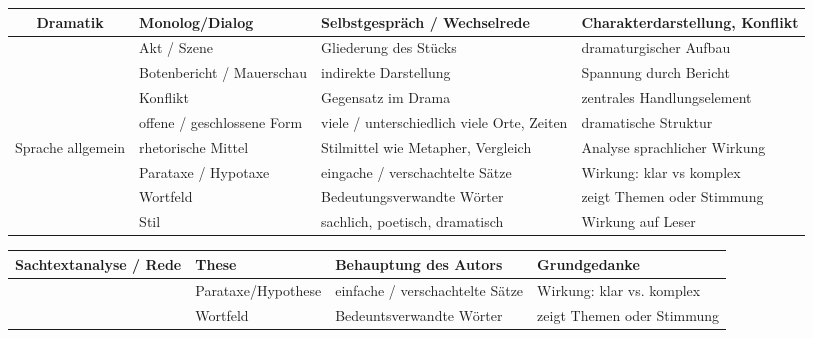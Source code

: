 \begin{tabularx}{\textwidth}{|c|p{2.5cm}|X|X|}
    \hline
    Dramatik & Monolog/Dialog & Selbstgespräch / Wechselrede & Charakterdarstellung, Konflikt \\
    \hline
    & Akt / Szene & Gliederung des Stücks & dramaturgischer Aufbau \\
    \hline
    & Botenbericht / Mauerschau & indirekte Darstellung & Spannung durch Bericht \\
    \hline
    & Konflikt & Gegensatz im Drama & zentrales Handlungselement \\
    \hline
    & offene / geschlossene Form & viele / unterschiedlich viele Orte, Zeiten & dramatische Struktur \\
    \hline
    Sprache allgemein & rhetorische Mittel & Stilmittel wie Metapher, Vergleich & Analyse sprachlicher Wirkung \\
    \hline
    & Parataxe / Hypotaxe & eingache / verschachtelte Sätze & Wirkung: klar vs komplex \\
    \hline
    & Wortfeld & Bedeutungsverwandte Wörter & zeigt Themen oder Stimmung \\
    \hline
    & Stil & sachlich, poetisch, dramatisch & Wirkung auf Leser \\
    \hline
\end{tabularx}

\setlength{\tabcolsep}{4pt}

\renewcommand{\arraystretch}{1.3}
\begin{tabularx}{\textwidth}{|c|p{2.5cm}|X|X|}
    \hline
    Sachtextanalyse / Rede & These & Behauptung des Autors & Grundgedanke \\
    \hline
    & Parataxe/Hypothese & einfache / verschachtelte Sätze & Wirkung: klar vs. komplex \\
    \hline
    & Wortfeld & Bedeuntsverwandte Wörter & zeigt Themen oder Stimmung \\
    \hline
\end{tabularx}
